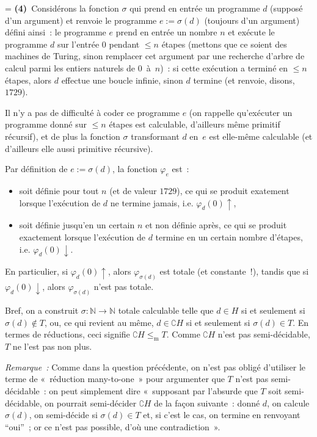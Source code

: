 \documentclass[12pt,a4paper]{article}
\theoremstyle{definition}
\newif\ifcorrige
\newenvironment{corrige}%
{\ifcorrige\relax\else\setbox0=\vbox\bgroup\fi%
\smallbreak\footnotesize\noindent{\underbar{\textit{Corrigé.}}\quad}}
{{\hbox{}\nobreak\hfill\checkmark}%
\ifcorrige\relax\else\egroup\fi\par}
\begin{document}
\begin{corrige}
\textbf{(4)} Considérons la fonction $\sigma$ qui prend en entrée un
programme $d$ (supposé d'un argument) et renvoie le programme $e :=
\sigma(d)$ (toujours d'un argument) défini ainsi : le programme $e$
prend en entrée un nombre $n$ et exécute le programme $d$ sur l'entrée
$0$ pendant $\leq n$ étapes (mettons que ce soient des machines de
Turing, sinon remplacer cet argument par une recherche d'arbre de
calcul parmi les entiers naturels de $0$ à $n$) : si cette exécution a
terminé en $\leq n$ étapes, alors $d$ effectue une boucle infinie,
sinon $d$ termine (et renvoie, disons, $1729$).

Il n'y a pas de difficulté à coder ce programme $e$ (on rappelle
qu'exécuter un programme donné sur $\leq n$ étapes est calculable,
d'ailleurs même primitif récursif), et de plus la fonction $\sigma$
transformant $d$ en $e$ est elle-même calculable (et d'ailleurs elle
aussi primitive récursive).

Par définition de $e := \sigma(d)$, la fonction $\varphi_e$ est :
\begin{itemize}
\item soit définie pour tout $n$ (et de valeur $1729$), ce qui se
  produit exatement lorsque l'exécution de $d$ ne termine jamais,
  i.e. $\varphi_d(0) \uparrow$,
\item soit définie jusqu'en un certain $n$ et non définie après, ce
  qui se produit exactement lorsque l'exécution de $d$ termine en un
  certain nombre d'étapes, i.e. $\varphi_d(0) \downarrow$.
\end{itemize}
En particulier, si $\varphi_d(0)\uparrow$, alors $\varphi_{\sigma(d)}$
est totale (et constante !), tandis que si $\varphi_d(0)\downarrow$,
alors $\varphi_{\sigma(d)}$ n'est pas totale.

Bref, on a construit $\sigma\colon\mathbb{N}\to\mathbb{N}$ totale
calculable telle que $d \in H$ si et seulement si $\sigma(d) \not\in
T$, ou, ce qui revient au même, $d \in \complement H$ si et seulement
si $\sigma(d) \in T$.  En termes de réductions, ceci signifie
$\complement H \mathrel{\leq_\mathrm{m}} T$.  Comme $\complement H$
n'est pas semi-décidable, $T$ ne l'est pas non plus.

\emph{Remarque :} Comme dans la question précédente, on n'est pas
obligé d'utiliser le terme de « réduction many-to-one » pour
argumenter que $T$ n'est pas semi-décidable : on peut simplement dire
« supposant par l'absurde que $T$ soit semi-décidable, on pourrait
semi-décider $\complement H$ de la façon suivante : donné $d$, on
calcule $\sigma(d)$, on semi-décide si $\sigma(d) \in T$ et, si c'est
le cas, on termine en renvoyant “oui” ; or ce n'est pas possible, d'où
une contradiction ».
\end{corrige}
\end{document}
